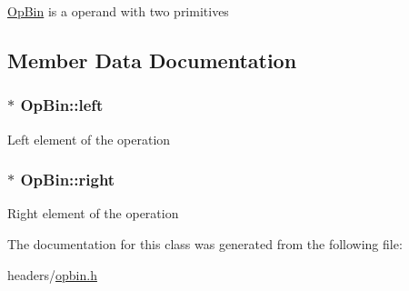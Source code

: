 \hyperlink{class_op_bin}{\-Op\-Bin} is a operand with two primitives 

\subsection{\-Member \-Data \-Documentation}
\hypertarget{class_op_bin_a5f5db8a000a36f5c609313d0d880ed61}{
\subsubsection[{left}]{$\ast$ {\bf \-Op\-Bin\-::left}}}
\label{class_op_bin_a5f5db8a000a36f5c609313d0d880ed61}
\-Left element of the operation \hypertarget{class_op_bin_a1c79a6c7464203dbf5aa7167dfbdb301}{
\subsubsection[{right}]{$\ast$ {\bf \-Op\-Bin\-::right}}}
\label{class_op_bin_a1c79a6c7464203dbf5aa7167dfbdb301}
\-Right element of the operation 

\-The documentation for this class was generated from the following file\-:\begin{DoxyCompactItemize}
\item 
headers/\hyperlink{opbin_8h}{opbin.\-h}\end{DoxyCompactItemize}
